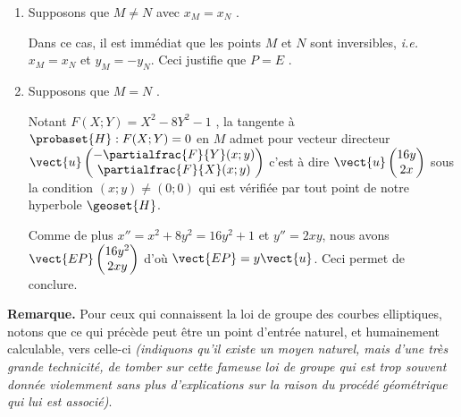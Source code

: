 \begin{enumerate}

	\medskip
	\item Supposons que $M \neq N$ avec $x_M = x_N$ .
	
	\smallskip
	
	\noindent
	Dans ce cas, il est immédiat que les points $M$ et $N$ sont inversibles, \emph{i.e.} $x_M = x_N$ et $y_M = -y_N$.
	Ceci justifie que $P = E$ .


	\medskip
	\item Supposons que $M = N$ .
	
	\smallskip
	
	\noindent
	Notant $F(X ; Y) = X^2 - 8 Y^2 - 1$ , la tangente à $\probaset{H} : F(X ; Y) = 0$ en $M$ admet pour vecteur directeur
	$\vect{u} \begin{pmatrix} 
	  - \partialfrac{F}{Y}(x ; y)    \\ 
	  \partialfrac{F}{X}(x ; y) 
	\end{pmatrix}$
	c'est à dire
	$\vect{u} \begin{pmatrix} 
	  16y    \\ 
	  2x 
	\end{pmatrix}$
	sous la condition $(x ; y) \neq (0 ; 0)$ qui est vérifiée par tout point de notre hyperbole $\geoset{H}$. 
	
	
	\noindent
	Comme de plus $x'' = x^2 + 8y^2 = 16y^2 + 1$ et $y'' = 2xy$, nous avons
	$\vect{EP} \begin{pmatrix} 
	  16y^2    \\ 
	  2xy
	\end{pmatrix}$
	d'où
	$\vect{EP} = y \vect{u}$.
	Ceci permet de conclure.
\end{enumerate}



\bigskip

\textbf{Remarque.} Pour ceux qui connaissent la loi de groupe des courbes elliptiques, notons que ce qui précède peut être un point d'entrée naturel, et humainement calculable, vers celle-ci \textit{(indiquons qu'il existe un moyen naturel, mais d'une très grande technicité, de tomber sur cette fameuse loi de groupe qui est trop souvent donnée violemment sans plus d'explications sur la raison du procédé géométrique qui lui est associé)}.